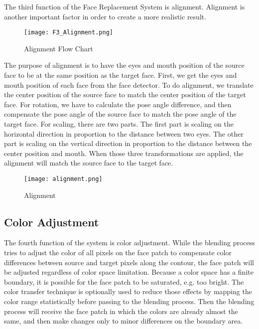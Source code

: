 \hspace{0.5in}The third function of the Face Replacement System is alignment. Alignment is another important factor in order to create a more realistic result.

\begin{figure}[htb]
   \centering
   \texttt{[image: F3\_Alignment.png]}
   \caption{Alignment Flow Chart}
   \label{fig:AlignmentFlowchart}
\end{figure}

The purpose of alignment is to have the eyes and mouth position of the source face to be at the same position as the target face. First, we get the eyes and mouth position of each face from the face detector. To do alignment, we translate the center position of the source face to match the center position of the target face. For rotation, we have to calculate the pose angle difference, and then compensate the pose angle of the source face to match the pose angle of the target face. For scaling, there are two parts. The first part is scaling on the horizontal direction in proportion to the distance between two eyes. The other part is scaling on the vertical direction in proportion to the distance between the center position and mouth. When those three transformations are applied, the alignment will match the source face to the target face.

\begin{figure}[htb]
   \centering
   \texttt{[image: alignment.png]}
   \caption{Alignment}
   \label{fig:Alignment}
\end{figure}

\subsection{Color Adjustment}

\hspace{0.5in}The fourth function of the system is color adjustment. While the blending process tries to adjust the color of all pixels on the face patch to compensate color differences between source and target pixels along the contour, the face patch will be adjusted regardless of color space limitation. Because a color space has a finite boundary, it is possible for the face patch to be saturated, e.g. too bright. The color transfer technique is optionally used to reduce those effects by mapping the color range statistically before passing to the blending process. Then the blending process will receive the face patch in which the colors are already almost the same, and then make changes only to minor differences on the boundary area.

